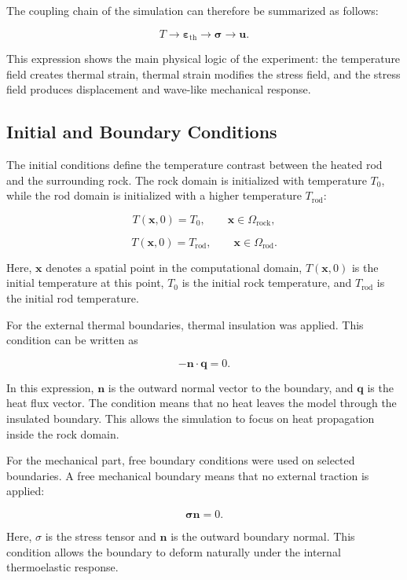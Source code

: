 The coupling chain of the simulation can therefore be summarized as follows:

\[
T
\rightarrow
\boldsymbol{\varepsilon}_{\mathrm{th}}
\rightarrow
\boldsymbol{\sigma}
\rightarrow
\mathbf{u}.
\]

This expression shows the main physical logic of the experiment: the temperature field creates thermal strain, thermal strain modifies the stress field, and the stress field produces displacement and wave-like mechanical response.

\subsection{Initial and Boundary Conditions}

The initial conditions define the temperature contrast between the heated rod and the surrounding rock. The rock domain is initialized with temperature \(T_0\), while the rod domain is initialized with a higher temperature \(T_{\mathrm{rod}}\):

\[
T(\mathbf{x},0) = T_0,
\qquad
\mathbf{x} \in \Omega_{\mathrm{rock}},
\]

\[
T(\mathbf{x},0) = T_{\mathrm{rod}},
\qquad
\mathbf{x} \in \Omega_{\mathrm{rod}}.
\]

Here, \(\mathbf{x}\) denotes a spatial point in the computational domain, \(T(\mathbf{x},0)\) is the initial temperature at this point, \(T_0\) is the initial rock temperature, and \(T_{\mathrm{rod}}\) is the initial rod temperature.

For the external thermal boundaries, thermal insulation was applied. This condition can be written as

\[
-\mathbf{n} \cdot \mathbf{q} = 0 .
\]

In this expression, \(\mathbf{n}\) is the outward normal vector to the boundary, and \(\mathbf{q}\) is the heat flux vector. The condition means that no heat leaves the model through the insulated boundary. This allows the simulation to focus on heat propagation inside the rock domain.

For the mechanical part, free boundary conditions were used on selected boundaries. A free mechanical boundary means that no external traction is applied:

\[
\boldsymbol{\sigma}\mathbf{n} = 0 .
\]

Here, \({\sigma}\) is the stress tensor and \(\mathbf{n}\) is the outward boundary normal. This condition allows the boundary to deform naturally under the internal thermoelastic response.

